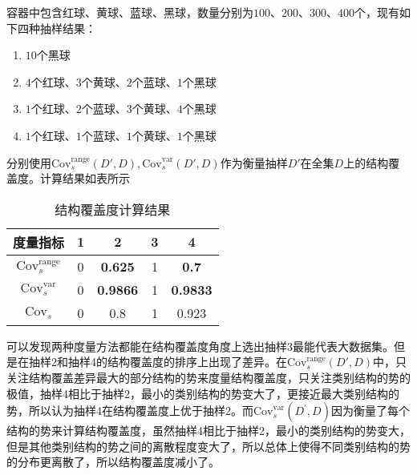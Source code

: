 \documentclass{../notes}
\newcommand{\Cov}{\text{Cov}}
\begin{document}
    \begin{example}
        容器中包含红球、黄球、蓝球、黑球，数量分别为$100$、$200$、$300$、$400$个，现有如下四种抽样结果：

        \begin{enumerate}
            \item $10$个黑球
            \item $4$个红球、$3$个黄球、$2$个蓝球、$1$个黑球
            \item $1$个红球、$2$个蓝球、$3$个黄球、$4$个黑球
            \item $1$个红球、$1$个蓝球、$1$个黄球、$1$个黑球
        \end{enumerate}

        分别使用$\Cov_s^\text{range}(D', D), \Cov_s^\text{var}(D', D)$作为衡量抽样$D'$在全集$D$上的结构覆盖度。计算结果如表所示

        \begin{table}[ht]
            \centering
            \caption{结构覆盖度计算结果}
            \begin{tabular}{ccccc}
                \toprule
                度量指标 & 1 & 2 & 3 & 4 \\
                \midrule
                $\Cov_s^\text{range}$ & 0 & \textbf{0.625} & 1 & \textbf{0.7} \\
                $\Cov_s^\text{var}$ & 0 & \textbf{0.9866} & 1 & \textbf{0.9833} \\
                $\Cov_s$ & 0 & 0.8 & 1 & 0.923 \\
                \bottomrule
            \end{tabular}
        \end{table}
    \end{example}

    可以发现两种度量方法都能在结构覆盖度角度上选出抽样3最能代表大数据集。但是在抽样2和抽样4的结构覆盖度的排序上出现了差异。在$\Cov_s^{\text{range}}(D', D)$中，只关注结构覆盖差异最大的部分结构的势来度量结构覆盖度，只关注类别结构的势的极值，抽样4相比于抽样2，最小的类别结构的势变大了，更接近最大类别结构的势，所以认为抽样4在结构覆盖度上优于抽样2。而$\Cov_s^{\text{var}}\left(D^\prime,D\right)$因为衡量了每个结构的势来计算结构覆盖度，虽然抽样4相比于抽样2，最小的类别结构的势变大，但是其他类别结构的势之间的离散程度变大了，所以总体上使得不同类别结构的势的分布更离散了，所以结构覆盖度减小了。
\end{document}
